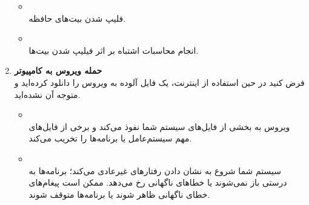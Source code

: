 \begin{qsolve}[]
\begin{enumerate}
\begin{itemize}
		\item {}\\
		فلیپ شدن بیت‌های حافظه.
		
		\item {}\\
		انجام محاسبات اشتباه بر اثر فیلیپ شدن بیت‌ها.
	\end{itemize}
	
	
	
	\item 
	\textbf{حمله ویروس به کامپیوتر}\\
	فرض کنید در حین استفاده از اینترنت، یک فایل آلوده به ویروس را دانلود کرده‌اید و متوجه آن نشده‌اید.
	
	\begin{itemize}
		\item {}\\
		ویروس به بخشی از فایل‌های سیستم شما نفوذ می‌کند و برخی از فایل‌های مهم سیستم‌عامل یا برنامه‌ها را تخریب می‌کند.
		
		\item {}\\
		سیستم شما شروع به نشان دادن رفتارهای غیرعادی می‌کند؛ برنامه‌ها به درستی باز نمی‌شوند یا خطاهای ناگهانی رخ می‌دهد. ممکن است پیغام‌های خطای ناگهانی ظاهر شوند یا برنامه‌ها متوقف شوند.
	\end{itemize}
	\end{enumerate}
\end{qsolve}



